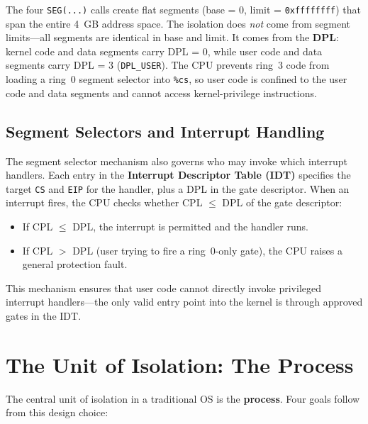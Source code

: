\documentclass[11pt]{article}
\begin{document}
The four \texttt{SEG(...)} calls create flat segments (base = 0, limit = \texttt{0xffffffff})
that span the entire 4~GB address space. The isolation does \emph{not} come from segment
limits---all segments are identical in base and limit. It comes from the \textbf{DPL}:
kernel code and data segments carry DPL = 0, while user code and data segments carry DPL = 3
(\texttt{DPL\_USER}). The CPU prevents ring~3 code from loading a ring~0 segment selector
into \texttt{\%cs}, so user code is confined to the user code and data segments and cannot
access kernel-privilege instructions.

\subsection{Segment Selectors and Interrupt Handling}

The segment selector mechanism also governs who may invoke which interrupt handlers. Each
entry in the \textbf{Interrupt Descriptor Table (IDT)} specifies the target \texttt{CS} and
\texttt{EIP} for the handler, plus a DPL in the gate descriptor. When an interrupt fires,
the CPU checks whether CPL $\leq$ DPL of the gate descriptor:

\begin{itemize}
    \item If CPL $\leq$ DPL, the interrupt is permitted and the handler runs.
    \item If CPL $>$ DPL (user trying to fire a ring~0-only gate), the CPU raises a general
          protection fault.
\end{itemize}

This mechanism ensures that user code cannot directly invoke privileged interrupt
handlers---the only valid entry point into the kernel is through approved gates in the IDT.

\section{The Unit of Isolation: The Process}

The central unit of isolation in a traditional OS is the \textbf{process}. Four goals
follow from this design choice:
\end{document}
